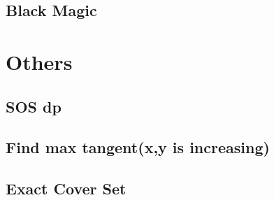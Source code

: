 \documentclass[a4paper,10pt,twocolumn,oneside]{article}
\begin{document}
\subsection{Black Magic}


\section{Others}

\subsection{SOS dp}


\subsection{Find max tangent(x,y is increasing)}


\subsection{Exact Cover Set}


%


\end{document}
